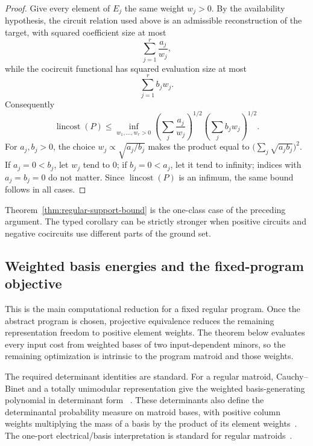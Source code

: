 \documentclass[11pt]{article}
\numberwithin{equation}{section}
\theoremstyle{remark}
\begin{document}
\begin{proof}
Give every element of $E_j$ the same weight $w_j>0$. By the availability
hypothesis, the circuit relation used above is an admissible reconstruction
of the target, with squared coefficient size at most
\begin{equation}
    \sum_{j=1}^r\frac{a_j}{w_j},
\end{equation}
while the cocircuit functional has squared evaluation size at most
\begin{equation}
    \sum_{j=1}^r b_jw_j.
\end{equation}
Consequently
\begin{equation}
    \operatorname{lincost}(P)
    \leq
    \inf_{w_1,\ldots,w_r>0}
    \left(
        \sum_j\frac{a_j}{w_j}
    \right)^{1/2}
    \left(
        \sum_j b_jw_j
    \right)^{1/2}.
\end{equation}
For $a_j,b_j>0$, the choice
$w_j\propto\sqrt{a_j/b_j}$ makes the product equal to
$\bigl(\sum_j\sqrt{a_jb_j}\bigr)^2$. If $a_j=0<b_j$, let $w_j$ tend to
$0$; if $b_j=0<a_j$, let it tend to infinity; indices with
$a_j=b_j=0$ do not matter. Since $\operatorname{lincost}(P)$ is an
infimum, the same bound follows in all cases.
\end{proof}

Theorem~\ref{thm:regular-support-bound} is the one-class case of the
preceding argument. The typed corollary can be strictly stronger when
positive circuits and negative cocircuits use different parts of the ground
set.

\subsection{Weighted basis energies and the fixed-program objective}
\label{subsec:regular-basis-energy}

This is the main computational reduction for a fixed regular program. Once
the abstract program is chosen, projective equivalence reduces the remaining
representation freedom to positive element weights. The theorem below
evaluates every input cost from weighted bases of two input-dependent minors,
so the remaining optimization is intrinsic to the program matroid and those
weights.

The required determinant identities are standard. For a regular matroid,
Cauchy--Binet and a totally unimodular representation give the weighted
basis-generating polynomial in determinant form
~\cite{ChoeOxleySokalWagner2004}. These determinants also define the
determinantal probability measure on matroid bases, with positive column
weights multiplying the mass of a basis by the product of its element
weights~\cite{Lyons2003}. The one-port electrical/basis interpretation is standard for regular matroids~\cite{Chaiken1987,Chaiken2006PortedTutte}.
\end{document}
